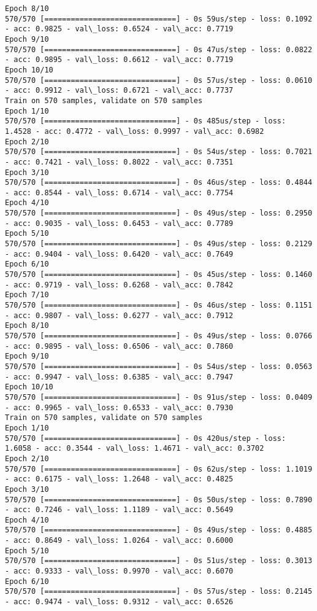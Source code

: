 \documentclass[11pt]{article}
\begin{document}
\begin{Verbatim}[commandchars=\\\{\}]
Epoch 8/10
570/570 [==============================] - 0s 59us/step - loss: 0.1092 - acc: 0.9825 - val\_loss: 0.6524 - val\_acc: 0.7719
Epoch 9/10
570/570 [==============================] - 0s 47us/step - loss: 0.0822 - acc: 0.9895 - val\_loss: 0.6612 - val\_acc: 0.7719
Epoch 10/10
570/570 [==============================] - 0s 57us/step - loss: 0.0610 - acc: 0.9912 - val\_loss: 0.6721 - val\_acc: 0.7737
Train on 570 samples, validate on 570 samples
Epoch 1/10
570/570 [==============================] - 0s 485us/step - loss: 1.4528 - acc: 0.4772 - val\_loss: 0.9997 - val\_acc: 0.6982
Epoch 2/10
570/570 [==============================] - 0s 54us/step - loss: 0.7021 - acc: 0.7421 - val\_loss: 0.8022 - val\_acc: 0.7351
Epoch 3/10
570/570 [==============================] - 0s 46us/step - loss: 0.4844 - acc: 0.8544 - val\_loss: 0.6714 - val\_acc: 0.7754
Epoch 4/10
570/570 [==============================] - 0s 49us/step - loss: 0.2950 - acc: 0.9035 - val\_loss: 0.6453 - val\_acc: 0.7789
Epoch 5/10
570/570 [==============================] - 0s 49us/step - loss: 0.2129 - acc: 0.9404 - val\_loss: 0.6420 - val\_acc: 0.7649
Epoch 6/10
570/570 [==============================] - 0s 45us/step - loss: 0.1460 - acc: 0.9719 - val\_loss: 0.6268 - val\_acc: 0.7842
Epoch 7/10
570/570 [==============================] - 0s 46us/step - loss: 0.1151 - acc: 0.9807 - val\_loss: 0.6277 - val\_acc: 0.7912
Epoch 8/10
570/570 [==============================] - 0s 49us/step - loss: 0.0766 - acc: 0.9895 - val\_loss: 0.6506 - val\_acc: 0.7860
Epoch 9/10
570/570 [==============================] - 0s 54us/step - loss: 0.0563 - acc: 0.9947 - val\_loss: 0.6385 - val\_acc: 0.7947
Epoch 10/10
570/570 [==============================] - 0s 91us/step - loss: 0.0409 - acc: 0.9965 - val\_loss: 0.6533 - val\_acc: 0.7930
Train on 570 samples, validate on 570 samples
Epoch 1/10
570/570 [==============================] - 0s 420us/step - loss: 1.6058 - acc: 0.3544 - val\_loss: 1.4671 - val\_acc: 0.3702
Epoch 2/10
570/570 [==============================] - 0s 62us/step - loss: 1.1019 - acc: 0.6175 - val\_loss: 1.2648 - val\_acc: 0.4825
Epoch 3/10
570/570 [==============================] - 0s 50us/step - loss: 0.7890 - acc: 0.7246 - val\_loss: 1.1189 - val\_acc: 0.5649
Epoch 4/10
570/570 [==============================] - 0s 49us/step - loss: 0.4885 - acc: 0.8649 - val\_loss: 1.0264 - val\_acc: 0.6000
Epoch 5/10
570/570 [==============================] - 0s 51us/step - loss: 0.3013 - acc: 0.9333 - val\_loss: 0.9970 - val\_acc: 0.6070
Epoch 6/10
570/570 [==============================] - 0s 57us/step - loss: 0.2145 - acc: 0.9474 - val\_loss: 0.9312 - val\_acc: 0.6526

\end{Verbatim}
\end{document}
